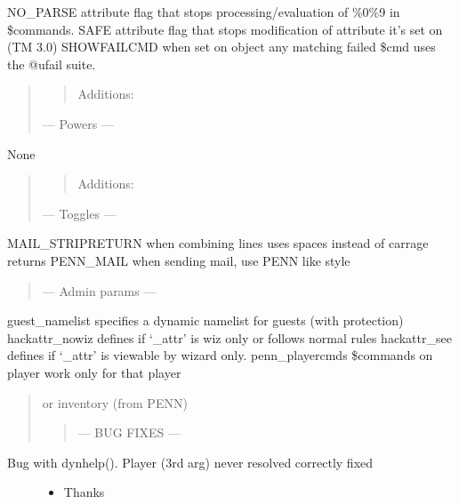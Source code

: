\documentclass[letterpaper,10pt,english]{sphinxmanual}
\begin{document}
\sphinxAtStartPar
NO\_PARSE \sphinxhyphen{} attribute flag that stops processing/evaluation of \%0\sphinxhyphen{}\%9 in \$commands.
SAFE \sphinxhyphen{} attribute flag that stops modification of attribute it’s set on (TM 3.0)
SHOWFAILCMD \sphinxhyphen{} when set on object any matching failed \$cmd uses the @ufail suite.
\begin{quote}
\begin{quote}

\sphinxAtStartPar
Additions:
\end{quote}

\sphinxAtStartPar
— Powers —
\end{quote}

\sphinxAtStartPar
None
\begin{quote}
\begin{quote}

\sphinxAtStartPar
Additions:
\end{quote}

\sphinxAtStartPar
— Toggles —
\end{quote}

\sphinxAtStartPar
MAIL\_STRIPRETURN \sphinxhyphen{} when combining lines uses spaces instead of carrage returns
PENN\_MAIL \sphinxhyphen{} when sending mail, use PENN like style
\begin{quote}

\sphinxAtStartPar
— Admin params —
\end{quote}

\sphinxAtStartPar
guest\_namelist \sphinxhyphen{} specifies a dynamic namelist for guests (with protection)
hackattr\_nowiz \sphinxhyphen{} defines if ‘\_attr’ is wiz only or follows normal rules
hackattr\_see \sphinxhyphen{} defines if ‘\_attr’ is viewable by wizard only.
penn\_playercmds \sphinxhyphen{} \$commands on player work only for that player
\begin{quote}

\sphinxAtStartPar
or inventory (from PENN)
\begin{quote}

\sphinxAtStartPar
— BUG FIXES —
\end{quote}
\end{quote}
\begin{description}
\item[{Bug with dynhelp().  Player (3rd arg) never resolved correctly \sphinxhyphen{} fixed}] \leavevmode\begin{itemize}
\item {} 
\sphinxAtStartPar
Thanks 

\end{itemize}

\end{description}
\end{document}
